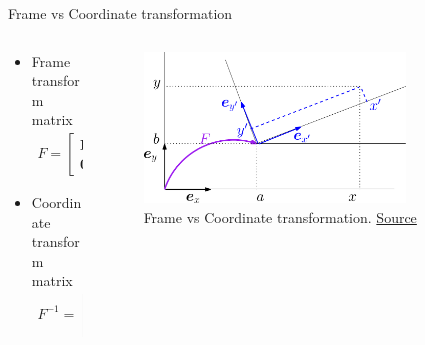 \documentclass[10pt,xcolor={table,dvipsnames},t]{beamer}
\begin{document}
\begin{frame}{Frame vs Coordinate transformation}

  \begin{columns}
    \begin{column}{0.5\textwidth}
\begin{itemize}
  \item Frame transform matrix
  \begin{align*}
    F = \begin{bmatrix}
    \mathbf{R} & \mathbf{t} \\
    \mathbf{0}^T & 1
    \end{bmatrix}.
  \end{align*}
 \item Coordinate transform matrix
   \begin{align*}
    F^{-1} = \begin{bmatrix}
    \mathbf{R}^T & -\mathbf{R^T t} \\
    \mathbf{0}^T & 1
    \end{bmatrix}.
   \end{align*}
\end{itemize}
    \end{column}

    \begin{column}{0.5\textwidth}
      \begin{figure}
        \centering
        \includegraphics[width=0.8\textwidth]{figures/coord-frame.pdf}
        \caption{Frame vs Coordinate transformation. \href{https://staff.fnwi.uva.nl/r.vandenboomgaard/ComputerVision/LectureNotes/MATH/homogenous.html\#coordinate-frame-transforms}{Source}}
      \end{figure}
    \end{column}
  \end{columns}

\end{frame}
\end{document}
